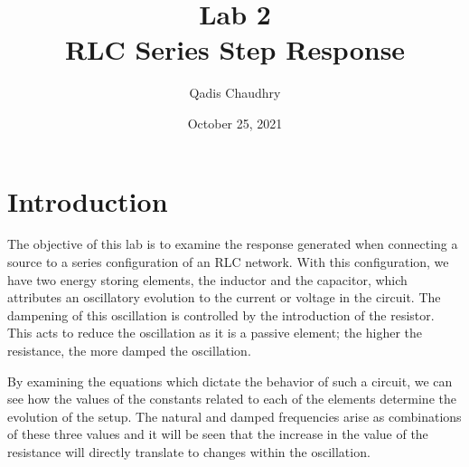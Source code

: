 \documentclass[12pt]{article}
\title{Lab 2 \\ RLC Series Step Response}
\author{Qadis Chaudhry}
\date{October 25, 2021}
\begin{document}
\maketitle
    \section*{Introduction}
    \par The objective of this lab is to examine the response generated when connecting a source to a series configuration of an RLC network. With this configuration, we have two energy storing elements, the inductor and the capacitor, which attributes an oscillatory evolution to the current or voltage in the circuit. The dampening of this oscillation is controlled by the introduction of the resistor. This acts to reduce the oscillation as it is a passive element; the higher the resistance, the more damped the oscillation.
    \par By examining the equations which dictate the behavior of such a circuit, we can see how the values of the constants related to each of the elements determine the evolution of the setup. The natural and damped frequencies arise as combinations of these three values and it will be seen that the increase in the value of the resistance will directly translate to changes within the oscillation.
\end{document}
